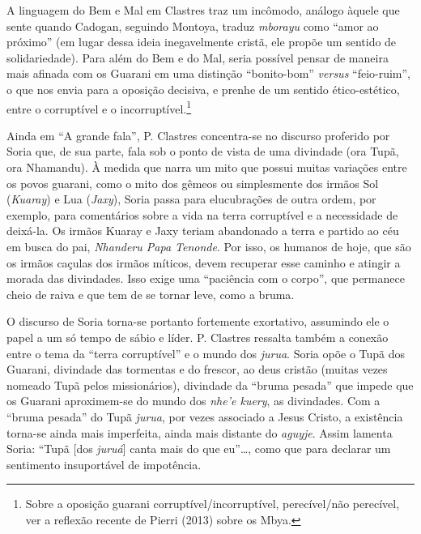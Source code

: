 {{A linguagem do Bem e Mal em Clastres traz um incômodo, análogo àquele
que sente quando Cadogan, seguindo Montoya, traduz \emph{mborayu} como ``amor
ao próximo'' (em lugar dessa ideia inegavelmente cristã, ele propõe um sentido
de solidariedade). Para além do Bem e do Mal, seria
possível pensar de maneira mais afinada com os Guarani em uma distinção
``bonito-bom'' \emph{versus} ``feio-ruim'', o que nos envia para a oposição decisiva,
e prenhe de um sentido ético-estético, entre o corruptível e o
incorruptível.\footnote{Sobre a oposição guarani
corruptível/incorruptível, perecível/não perecível, ver a reflexão
recente de Pierri (2013) sobre os Mbya. } 

Ainda em ``A grande fala'', P. Clastres concentra-se no discurso proferido
por Soria que, de sua parte, fala sob o ponto de vista de uma divindade
(ora Tupã, ora Nhamandu). À medida que narra um mito que possui muitas
variações entre os povos guarani, como o mito dos gêmeos ou
simplesmente dos irmãos Sol (\emph{Kuaray}) e Lua (\emph{Jaxy}), Soria passa para
elucubrações de outra ordem, por exemplo, para comentários sobre a vida
na terra corruptível e a necessidade de deixá-la. Os irmãos Kuaray e
Jaxy teriam abandonado a terra e partido ao céu em busca do pai,
\emph{Nhanderu Papa Tenonde}. Por isso, os humanos de hoje, que são os irmãos
caçulas dos irmãos míticos, devem recuperar esse caminho e atingir a
morada das divindades. Isso exige uma ``paciência com o corpo'', que
permanece cheio de raiva e que tem de se tornar leve, como a bruma. 

O discurso de Soria torna-se portanto fortemente exortativo, assumindo
ele o papel a um só tempo de sábio e líder. P. Clastres ressalta também
a conexão entre o tema da ``terra corruptível'' e o mundo dos \emph{jurua}.
Soria opõe o Tupã dos Guarani, divindade das tormentas e do frescor, ao
deus cristão (muitas vezes nomeado Tupã pelos missionários), divindade
da ``bruma pesada'' que impede que os Guarani aproximem-se do mundo dos
\emph{nhe’e kuery}, as divindades. Com a ``bruma pesada'' do Tupã \emph{jurua}, por
vezes associado a Jesus Cristo, a existência torna-se ainda mais
imperfeita, ainda mais distante do \emph{aguyje}. Assim lamenta Soria: ``Tupã
[dos \emph{juruá}] canta mais do que eu''\ldots{}, como que para declarar um
sentimento insuportável de impotência. 

}}
